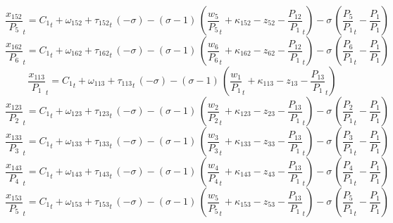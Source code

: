 \begin{dmath}
{{\frac{x_{152}}{P_{5}}}}_{t}={{C_{1}}}_{t}+{{\omega_{152}}}+{{\tau_{152}}}_{t}\, \left(-{{\sigma}}\right)-\left({{\sigma}}-1\right)\, \left({{\frac{w_{5}}{P_{5}}}}_{t}+{{\kappa_{152}}}-{{z_{52}}}-{{\frac{P_{12}}{P_{1}}}}_{t}\right)-{{\sigma}}\, \left({{\frac{P_{5}}{P_{1}}}}_{t}-{{\frac{P_{1}}{P_{1}}}}\right)
\end{dmath}
\begin{dmath}
{{\frac{x_{162}}{P_{6}}}}_{t}={{C_{1}}}_{t}+{{\omega_{162}}}+{{\tau_{162}}}_{t}\, \left(-{{\sigma}}\right)-\left({{\sigma}}-1\right)\, \left({{\frac{w_{6}}{P_{6}}}}_{t}+{{\kappa_{162}}}-{{z_{62}}}-{{\frac{P_{12}}{P_{1}}}}_{t}\right)-{{\sigma}}\, \left({{\frac{P_{6}}{P_{1}}}}_{t}-{{\frac{P_{1}}{P_{1}}}}\right)
\end{dmath}
\begin{dmath}
{{\frac{x_{113}}{P_{1}}}}_{t}={{C_{1}}}_{t}+{{\omega_{113}}}+{{\tau_{113}}}_{t}\, \left(-{{\sigma}}\right)-\left({{\sigma}}-1\right)\, \left({{\frac{w_{1}}{P_{1}}}}_{t}+{{\kappa_{113}}}-{{z_{13}}}-{{\frac{P_{13}}{P_{1}}}}_{t}\right)
\end{dmath}
\begin{dmath}
{{\frac{x_{123}}{P_{2}}}}_{t}={{C_{1}}}_{t}+{{\omega_{123}}}+{{\tau_{123}}}_{t}\, \left(-{{\sigma}}\right)-\left({{\sigma}}-1\right)\, \left({{\frac{w_{2}}{P_{2}}}}_{t}+{{\kappa_{123}}}-{{z_{23}}}-{{\frac{P_{13}}{P_{1}}}}_{t}\right)-{{\sigma}}\, \left({{\frac{P_{2}}{P_{1}}}}_{t}-{{\frac{P_{1}}{P_{1}}}}\right)
\end{dmath}
\begin{dmath}
{{\frac{x_{133}}{P_{3}}}}_{t}={{C_{1}}}_{t}+{{\omega_{133}}}+{{\tau_{133}}}_{t}\, \left(-{{\sigma}}\right)-\left({{\sigma}}-1\right)\, \left({{\frac{w_{3}}{P_{3}}}}_{t}+{{\kappa_{133}}}-{{z_{33}}}-{{\frac{P_{13}}{P_{1}}}}_{t}\right)-{{\sigma}}\, \left({{\frac{P_{3}}{P_{1}}}}_{t}-{{\frac{P_{1}}{P_{1}}}}\right)
\end{dmath}
\begin{dmath}
{{\frac{x_{143}}{P_{4}}}}_{t}={{C_{1}}}_{t}+{{\omega_{143}}}+{{\tau_{143}}}_{t}\, \left(-{{\sigma}}\right)-\left({{\sigma}}-1\right)\, \left({{\frac{w_{4}}{P_{4}}}}_{t}+{{\kappa_{143}}}-{{z_{43}}}-{{\frac{P_{13}}{P_{1}}}}_{t}\right)-{{\sigma}}\, \left({{\frac{P_{4}}{P_{1}}}}_{t}-{{\frac{P_{1}}{P_{1}}}}\right)
\end{dmath}
\begin{dmath}
{{\frac{x_{153}}{P_{5}}}}_{t}={{C_{1}}}_{t}+{{\omega_{153}}}+{{\tau_{153}}}_{t}\, \left(-{{\sigma}}\right)-\left({{\sigma}}-1\right)\, \left({{\frac{w_{5}}{P_{5}}}}_{t}+{{\kappa_{153}}}-{{z_{53}}}-{{\frac{P_{13}}{P_{1}}}}_{t}\right)-{{\sigma}}\, \left({{\frac{P_{5}}{P_{1}}}}_{t}-{{\frac{P_{1}}{P_{1}}}}\right)
\end{dmath}
